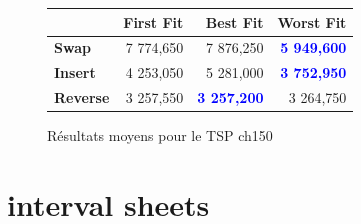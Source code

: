 \documentclass[a4paper,10pt]{report}
\begin{document}
\begin{figure}[h]
  \begin{center}
    \begin{tabular}{|l|r|r|r|}
      \hline
      &		\textbf{First Fit}&	\textbf{Best Fit}&	\textbf{Worst
Fit}\\\hline
      \textbf{Swap}&
	  7 774,650&
	  7 876,250&
	  \textbf{\textcolor{blue}{5 949,600}}\\\hline
      \textbf{Insert}&
	  4 253,050&
	  5 281,000&
	  \textbf{\textcolor{blue}{3 752,950}}\\\hline
      \textbf{Reverse}&
	  3 257,550&
	  \textbf{\textcolor{blue}{3 257,200}}&
	  3 264,750\\\hline
    \end{tabular}
    \caption{Résultats moyens pour le TSP ch150}
  \end{center}
\end{figure}

\section{interval sheets}

\end{document}
